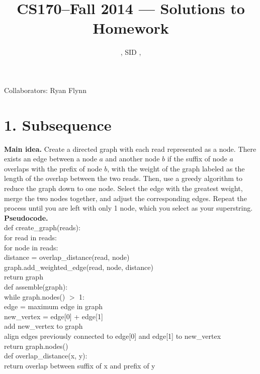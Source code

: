 \documentclass[11pt]{article}
\title{CS170--Fall 2014 --- Solutions to Homework \Homework}
\author{\Name, SID \SID, \texttt{\Login}}
\begin{document}
\maketitle

\noindent
Collaborators: Ryan Flynn


\section*{1. Subsequence}
\noindent
\textbf{Main idea.}
Create a directed graph with each read represented as a node.  There exists an edge between a node $a$ and another node $b$ if the suffix of node $a$ overlaps with the prefix of node $b$, with the weight of the graph labeled as the length of the overlap between the two reads.  Then, use a greedy algorithm to reduce the graph down to one node.  Select the edge with the greatest weight, merge the two nodes together, and adjust the corresponding edges.  Repeat the process until you are left with only 1 node, which you select as your superstring. \\

\noindent \textbf{Pseudocode.} \\
def create\_graph(reads):\\
\indent for read in reads: \\
\indent\indent for node in reads: \\
\indent\indent\indent distance = overlap\_distance(read, node) \\
\indent\indent\indent graph.add\_weighted\_edge(read, node, distance) \\
\indent return graph\\

\noindent def assemble(graph):\\
\indent while graph.nodes() $>$ 1: \\
\indent\indent edge = maximum edge in graph \\
\indent\indent new\_vertex = edge[0] + edge[1] \\
\indent\indent add new\_vertex to graph \\
\indent\indent align edges previously connected to edge[0] and edge[1] to new\_vertex \\
\indent return graph.nodes()\\

\noindent def overlap\_distance(x, y): \\
\indent return overlap between suffix of x and prefix of y \\
\end{document}

